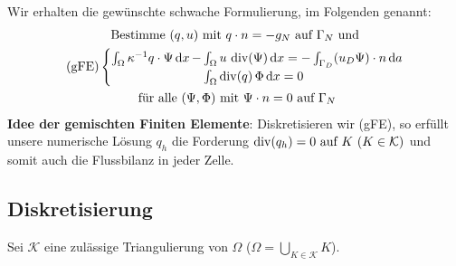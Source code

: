 Wir erhalten die gewünschte schwache Formulierung, im Folgenden  genannt:
\begin{gather*}
	\text{Bestimme } (q,u) \text{ mit } q\cdot n = -g_N \text{ auf } \Gamma_N \text{ und}\\
	\text{(gFE)}\begin{cases}
		\int_{\Omega} \kappa^{-1} q \cdot \Psi \mathop{}\!\mathrm{d} x \, - \mkern-15mu &\int_{\Omega} u \, \operatorname{div}(\Psi) \mathop{}\!\mathrm{d} x = - \int_{\Gamma_D} (u_D \Psi) \cdot n \mathop{}\!\mathrm{d} a\\
		&\int_{\Omega} \operatorname{div}(q) \, \Phi \mathop{}\!\mathrm{d} x = 0
	\end{cases}	\\
	\text{ für alle } (\Psi, \Phi) \text{ mit } \Psi \cdot n = 0 \text{ auf } \Gamma_N 
\end{gather*}
\textbf{Idee der gemischten Finiten Elemente}: Diskretisieren wir (gFE), so erfüllt unsere numerische Lösung $ q_h $ die Forderung $ \dive(q_h) = 0 \text{ auf } K \ (K \in \mathcal{K}) $ und somit auch die Flussbilanz in jeder Zelle.

\subsection{Diskretisierung}

Sei $ \mathcal{K} $ eine zulässige Triangulierung von $ \Omega $ ($ \Omega = \bigcup_{K \in \mathcal{K}} K $).

